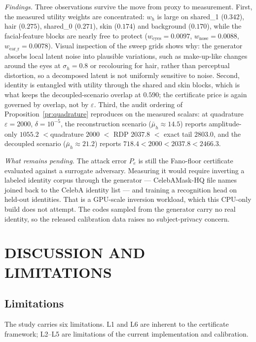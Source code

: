 \documentclass{ieeetj}
\theoremstyle{plain}
\theoremstyle{definition}
\begin{document}
\emph{Findings.} Three observations survive the move from proxy to
measurement. First, the measured utility weights are concentrated:
$w_h$ is large on shared\_1 ($0.342$), hair ($0.275$), shared\_0 ($0.271$),
skin ($0.174$) and background ($0.170$), while the facial-feature blocks are
nearly free to protect ($w_{\mathrm{eyes}}{=}0.0097$,
$w_{\mathrm{nose}}{=}0.0088$, $w_{\mathrm{ear\_r}}{=}0.0078$). Visual
inspection of the sweep grids shows why: the generator absorbs local latent
noise into plausible variations, such as make-up-like changes around the eyes
at $\sigma_h{=}0.8$ or recolouring for hair, rather than perceptual distortion,
so a decomposed latent is not uniformly sensitive to noise. Second, identity
is entangled with utility through the shared and skin blocks, which is what
keeps the decoupled-scenario overlap at $0.590$; the certificate price is
again governed by overlap, not by $\varepsilon$. Third, the audit ordering of
Proposition~\ref{pr:quadrature} reproduces on the measured scalars: at
quadrature $\varepsilon{=}2000$, $\delta{=}10^{-5}$, the reconstruction
scenario ($\bar\mu_h\approx14.5$) reports amplitude-only $1055.2$ $<
$quadrature $2000$ $<$ RDP $2037.8$ $<$ exact tail $2803.0$, and the decoupled
scenario ($\bar\mu_h\approx21.2$) reports $718.4 < 2000 < 2037.8 < 2466.3$.

\emph{What remains pending.} The attack error $P_e$ is still the Fano-floor certificate evaluated against a
surrogate adversary. Measuring it would require inverting a labeled identity corpus
through the generator --- CelebAMask-HQ file names joined back to the CelebA identity
list --- and training a recognition head on held-out identities. That is a GPU-scale
inversion workload, which this CPU-only build does not attempt. The codes sampled from
the generator carry no real identity, so the released calibration data raises no
subject-privacy concern.

\section{DISCUSSION AND LIMITATIONS}
\label{sec:discussion}

\subsection{Limitations}

The study carries six limitations. L1 and L6 are inherent to the certificate
framework; L2--L5 are limitations of the current implementation and calibration.
\end{document}
